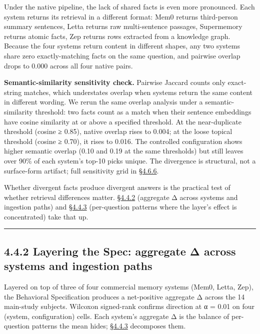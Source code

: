 Under the native pipeline, the lack of shared facts is even more
pronounced. Each system returns its retrieval in a different format:
Mem0 returns third-person summary sentences, Letta returns raw
multi-sentence passages, Supermemory returns atomic facts, Zep returns
rows extracted from a knowledge graph. Because the four systems return
content in different shapes, any two systems share zero exactly-matching
facts on the same question, and pairwise overlap drops to 0.000 across
all four native pairs.

\textbf{Semantic-similarity sensitivity check.} Pairwise Jaccard counts
only exact-string matches, which understates overlap when systems return
the same content in different wording. We rerun the same overlap
analysis under a semantic-similarity threshold: two facts count as a
match when their sentence embeddings have cosine similarity at or above
a specified threshold. At the near-duplicate threshold (cosine ≥ 0.85),
native overlap rises to 0.004; at the loose topical threshold
(cosine ≥ 0.70), it rises to 0.016. The controlled configuration shows
higher semantic overlap (0.10 and 0.19 at the same thresholds) but still
leaves over 90\% of each system's top-10 picks unique. The divergence
is structural, not a surface-form artifact; full sensitivity grid in
\hyperref[retrieval-overlap-sensitivity-semantic-similarity-matching-k-variation]{§4.6.6}.

Whether divergent facts produce divergent answers is the practical test
of whether retrieval differences matter. \hyperref[layering-the-spec-aggregate-ux3b4-across-systems-and-ingestion-paths]{§4.4.2} (aggregate Δ across
systems and ingestion paths) and \hyperref[where-the-spec-helps-where-it-hurts-and-which-question-types-route-to-each]{§4.4.3} (per-question patterns where the
layer's effect is concentrated) take that up.

\begin{center}\rule{0.5\linewidth}{0.5pt}\end{center}

\hypertarget{layering-the-spec-aggregate-ux3b4-across-systems-and-ingestion-paths}{%
\subsection{4.4.2 Layering the Spec: aggregate Δ across systems and
ingestion
paths}\label{layering-the-spec-aggregate-ux3b4-across-systems-and-ingestion-paths}}

Layered on top of three of four commercial memory systems (Mem0, Letta,
Zep), the Behavioral Specification produces a net-positive aggregate Δ
across the 14 main-study subjects. Wilcoxon signed-rank confirms
direction at α = 0.01 on four (system, configuration) cells. Each
system's aggregate Δ is the balance of per-question patterns the mean
hides; \hyperref[where-the-spec-helps-where-it-hurts-and-which-question-types-route-to-each]{§4.4.3} decomposes them.

